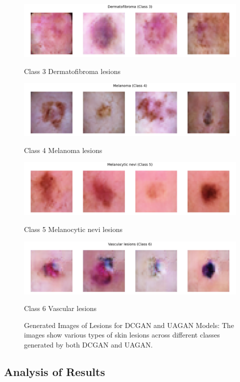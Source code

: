 \documentclass{article}
\begin{document}
\begin{figure}[htbp]
\begin{minipage}{0.45\textwidth}
        \includegraphics[width=\linewidth]{uagan-class_3_Dermatofibroma.png}
        \caption{Class 3 Dermatofibroma lesions}
        
        \includegraphics[width=\linewidth]{uagan-class_4_Melanoma.png}
        \caption{Class 4 Melanoma lesions}
        
        \includegraphics[width=\linewidth]{uagan-class_5_Melanocytic_nevi.png}
        \caption{Class 5 Melanocytic nevi lesions}

        \includegraphics[width=\linewidth]{uagan-class_6_Vascular_lesions.png}
        \caption{Class 6 Vascular lesions}
    \end{minipage}
    \setcounter{figure}{2}
    \caption{Generated Images of Lesions for DCGAN and UAGAN Models: The images show various types of skin lesions across different classes generated by both DCGAN and UAGAN.}
    \label{fig:comparison_dcgan_uagan}
\end{figure}

\subsection{Analysis of Results}
\end{document}
